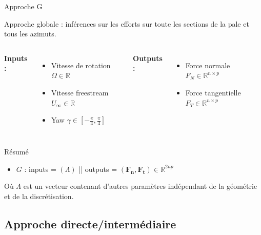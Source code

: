 \documentclass[
11pt,notheorems,hyperref={pdfauthor=whatever}
]{beamer}
\begin{document}
\begin{frame}{Approche G}

Approche globale : inférences sur les efforts sur toute les sections de la pale et tous les azimuts.

    \vspace{0.3cm}

    \begin{columns}[c]
        \textbf{Inputs :}
        \begin{itemize}\small
            \item Vitesse de rotation $\Omega \in \mathbb{R}$
            \item Vitesse freestream $U_{\infty} \in \mathbb{R}$
            \item Yaw $\gamma \in \left[-\frac{\pi}{4}, \frac{\pi}{4}\right]$
        \end{itemize}

        \centering

        \textbf{Outputs :}
        \begin{itemize}\small
            \item Force normale $F_N \in \mathbb{R}^{n \times p}$
            \item Force tangentielle $F_T \in \mathbb{R}^{n \times p}$
        \end{itemize}
    \end{columns}    
\end{frame}


\begin{frame}{Résumé}
    \begin{itemize}
        \item \centering  $G$ :     inputs = $(\Lambda)$                || outputs = $(\mathbf{F_n}, \mathbf{F_t}) \in \mathbb{R}^{2np}$
    \end{itemize}

     \vspace{0.3cm}

     Où $\Lambda$ est un vecteur contenant d'autres paramètres indépendant de la géométrie et de la discrétisation.
\end{frame}

\subsection{Approche directe/intermédiaire}
\end{document}
